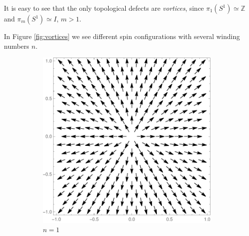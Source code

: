 It is easy to see that the only topological defects are \textit{vortices}, since $\pi_1(S^1) \simeq \mathbb{Z}$ and $\pi_m(S^1) \simeq I$, $m > 1$.



 In Figure \ref{fig:vortices} we see different spin configurations with several winding numbers $n$.
\begin{figure}
	\centering
	\begin{subfigure}{0.45\textwidth}
		\includegraphics[scale=1,trim= 120 100 100 100,clip]{./figures/vortex.pdf}
		\caption{$n=1$}
	\end{subfigure}
	\begin{subfigure}{0.45\textwidth}

\end{subfigure}
\end{figure}
